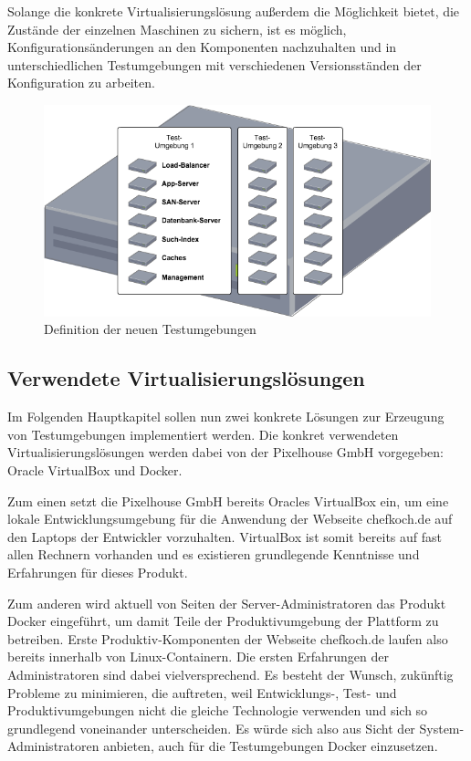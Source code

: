 Solange die konkrete Virtualisierungslösung außerdem die Möglichkeit bietet, die Zustände der einzelnen Maschinen zu sichern, ist es möglich, Konfigurationsänderungen an den Komponenten nachzuhalten und in unterschiedlichen Testumgebungen mit verschiedenen Versionsständen der Konfiguration zu arbeiten. 

\begin{figure}[!ht]
  \begin{center}
    \includegraphics[width=14cm]{bilder/Untersuchungs-Umgebung.png}
    \caption{Definition der neuen Testumgebungen}
  \end{center}
\end{figure}

\subsection{Verwendete Virtualisierungslösungen}

Im Folgenden Hauptkapitel sollen nun zwei konkrete Lösungen zur Erzeugung von Testumgebungen implementiert werden. Die konkret verwendeten Virtualisierungslösungen werden dabei von der Pixelhouse GmbH vorgegeben: Oracle VirtualBox und Docker.

Zum einen setzt die Pixelhouse GmbH bereits Oracles VirtualBox ein, um eine lokale Entwicklungsumgebung für die Anwendung der Webseite chefkoch.de auf den Laptops der Entwickler vorzuhalten. VirtualBox ist somit bereits auf fast allen Rechnern vorhanden und es existieren grundlegende Kenntnisse und Erfahrungen für dieses Produkt.

Zum anderen wird aktuell von Seiten der Server-Administratoren das Produkt Docker eingeführt, um damit Teile der Produktivumgebung der Plattform zu betreiben. Erste Produktiv-Komponenten der Webseite chefkoch.de laufen also bereits innerhalb von Linux-Containern. Die ersten Erfahrungen der Administratoren sind dabei vielversprechend. Es besteht der Wunsch, zukünftig Probleme zu minimieren, die auftreten, weil Entwicklungs-, Test- und Produktivumgebungen nicht die gleiche Technologie verwenden und sich so grundlegend voneinander unterscheiden. Es würde sich also aus Sicht der System-Administratoren anbieten, auch für die Testumgebungen Docker einzusetzen.
